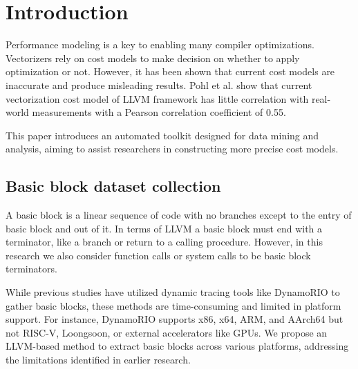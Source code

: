 \section{Introduction}
Performance modeling is a key to enabling many compiler optimizations. Vectorizers rely on cost models to make decision on whether to apply optimization or not. However, it has been shown that current cost models are inaccurate and produce misleading results. Pohl et al. \cite{pohlPortableCostModeling2019} show that current vectorization cost model of LLVM framework has little correlation with real-world measurements with a Pearson correlation coefficient of 0.55.

This paper introduces an automated toolkit designed for data mining and analysis, aiming to assist researchers in constructing more precise cost models.

\subsection{Basic block dataset collection}

A basic block is a linear sequence of code with no branches except to the entry of basic block and out of it. In terms of LLVM a basic block must end with a terminator, like a branch or return to a calling procedure. However, in this research we also consider function calls or system calls to be basic block terminators.

While previous studies have utilized dynamic tracing tools like DynamoRIO \cite{chenBHiveBenchmarkSuite2019} to gather basic blocks, these methods are time-consuming and limited in platform support. For instance, DynamoRIO supports x86, x64, ARM, and AArch64 \cite{brueningInfrastructureAdaptiveDynamic2003} but not RISC-V, Loongsoon, or external accelerators like GPUs. We propose an LLVM-based method to extract basic blocks across various platforms, addressing the limitations identified in earlier research.

